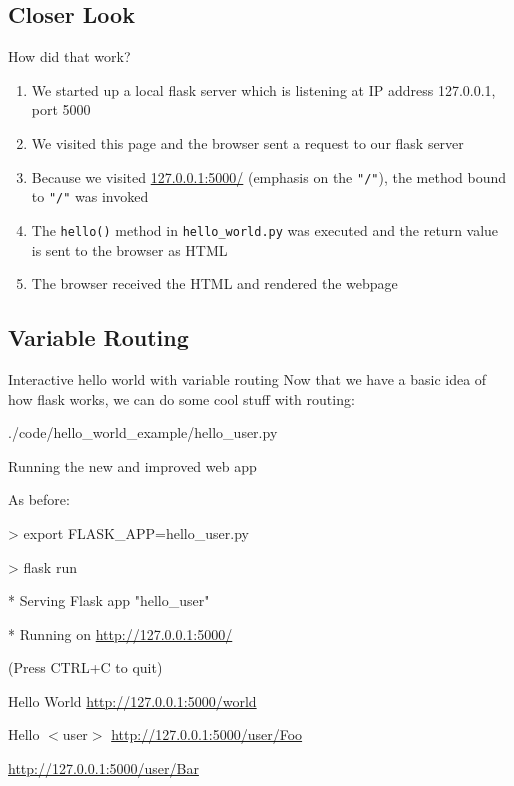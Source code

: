 \documentclass{beamer}
\begin{document}
\subsection{Closer Look}
	\begin{frame}[t]{How did that work?}
		\setbeamercovered{}
		\begin{enumerate}
			\item{We started up a local flask server which is listening at
					IP address 127.0.0.1, port 5000}
			\pause
			\item{We visited this page and the browser sent a request to our
					flask server}
			\pause
			\item{Because we visited \url{127.0.0.1:5000/} (emphasis on the
					\texttt{"/"}), the method bound to \texttt{"/"} was invoked}
			\pause
			\item{The \texttt{hello()} method in \texttt{hello\_world.py} was
					executed and the return value is sent to the browser as
					HTML}
			\pause
			\item{The browser received the HTML and rendered the webpage}
		\end{enumerate}
	\end{frame}


\subsection{Variable Routing}
	\begin{frame}[t]{Interactive hello world with variable routing}
		Now that we have a basic idea of how flask works, we can do some cool
		stuff with routing:
		\begin{block}{./code/hello\_world\_example/hello\_user.py}
			
		\end{block}
	\end{frame}

	\begin{frame}[t]{Running the new and improved web app}
		\begin{block}{As before:}
			\begin{semiverbatim}
				> export FLASK\_APP=hello\_user.py

				> flask run

				* Serving Flask app "hello\_user"

				* Running on \url{http://127.0.0.1:5000/}

					(Press CTRL+C to quit)
			\end{semiverbatim}
		\end{block}
		\pause

		\begin{block}{Hello World}
			\url{http://127.0.0.1:5000/world}
		\end{block}

		\begin{block}{Hello $<$user$>$}
			\url{http://127.0.0.1:5000/user/Foo}

			\url{http://127.0.0.1:5000/user/Bar}
		\end{block}
	\end{frame}
\end{document}
